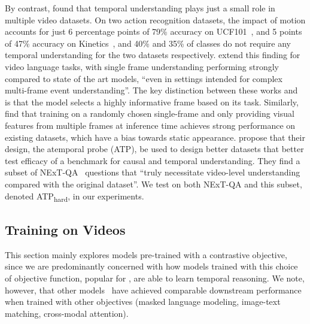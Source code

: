 By contrast, \citet{huang2018videotemporal} found that temporal understanding
plays just a small role in multiple video datasets. On two action recognition
datasets, the impact of motion accounts for just 6 percentage points of 79\%
accuracy on UCF101~\citep{soomro2012ucf101}, and 5 points of 47\% accuracy on
Kinetics~\citep{carreira2018kinetics600}, and 40\% and 35\% of classes do not
require any temporal understanding for the two datasets respectively.
\citet{buch2022revisiting} extend this finding for video language tasks, with
single frame understanding performing strongly compared to state of the art
models, ``even in settings intended for complex multi-frame event
understanding''.  The key distinction between these works
and~\citet{portilloquintero2021clipvidret} is that the model selects a highly
informative frame based on its task. Similarly, \citet{lei2023revealing} find
that training on a randomly chosen single-frame and only providing visual
features from multiple frames at inference time achieves strong performance on
existing datasets, which have a bias towards static appearance.
\citet{buch2022revisiting} propose that their design, the atemporal probe
(ATP), be used to design better datasets that better test efficacy of a
benchmark for causal and temporal understanding. They find a subset of
NExT-QA~\citep{xiao2021nextqa} questions that ``truly necessitate video-level
understanding compared with the original dataset''. We test on both NExT-QA and
this subset, denoted ATP\textsubscript{hard}, in our experiments.


\subsection{Training on Videos}
\label{ssec:vidtrain}


This section mainly explores models pre-trained with a contrastive objective,
since we are predominantly concerned with how models trained with this choice
of objective function, popular for , are able to learn
temporal reasoning. We note, however, that other
models~\citep{lei2021clipbert,xu2021vlm,alayrac2022flamingo} have achieved
comparable downstream performance when trained with other objectives (masked
language modeling, image-text matching, cross-modal attention).

